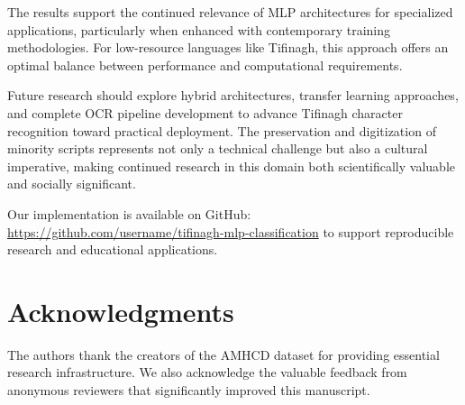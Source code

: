 \documentclass[12pt,a4paper]{article}
\begin{document}
	The results support the continued relevance of MLP architectures for specialized applications, particularly when enhanced with contemporary training methodologies. For low-resource languages like Tifinagh, this approach offers an optimal balance between performance and computational requirements.
	
	Future research should explore hybrid architectures, transfer learning approaches, and complete OCR pipeline development to advance Tifinagh character recognition toward practical deployment. The preservation and digitization of minority scripts represents not only a technical challenge but also a cultural imperative, making continued research in this domain both scientifically valuable and socially significant.
	
	Our implementation is available on GitHub: \url{https://github.com/username/tifinagh-mlp-classification} to support reproducible research and educational applications.
	
	\section*{Acknowledgments}
	
	The authors thank the creators of the AMHCD dataset for providing essential research infrastructure. We also acknowledge the valuable feedback from anonymous reviewers that significantly improved this manuscript.
	
\end{document}
